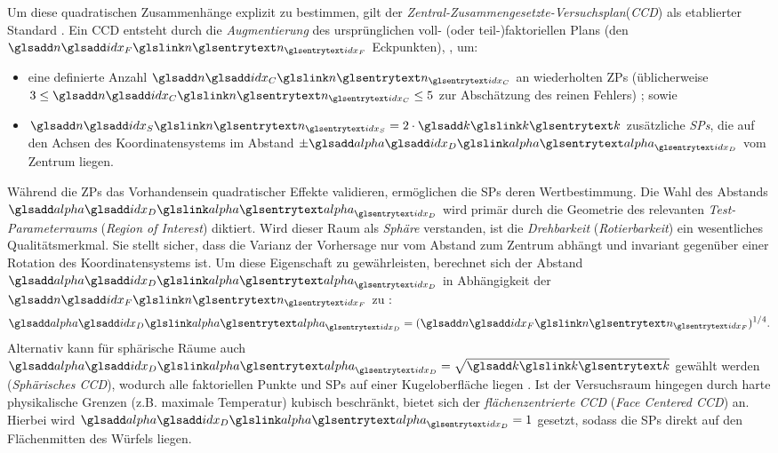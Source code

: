 Um diese quadratischen Zusammenhänge explizit zu bestimmen, gilt der \textit{Zentral-Zusammengesetzte-Versuchsplan}(\textit{\ac{CCD}}) als etablierter Standard .
Ein \ac{CCD} entsteht durch die \textit{Augmentierung} des ursprünglichen voll- (oder teil-)faktoriellen Plans (den $\symsub{n}{idx_F}$ Eckpunkten), , um:
\begin{itemize}
    \item eine definierte Anzahl $\symsub{n}{idx_C}$ an wiederholten \acp{ZP} (üblicherweise $3 \leq \symsub{n}{idx_C} \leq 5$ zur Abschätzung des reinen Fehlers) \cite{Montgomery.2021}; sowie
    \item $\symsub{n}{idx_S} = 2 \cdot \sym{k}$ zusätzliche \textit{\acp{SP}}, die auf den Achsen des Koordinatensystems im Abstand $\pm \symsub{alpha}{idx_D}$ vom Zentrum liegen.
\end{itemize}
Während die \acp{ZP} das Vorhandensein quadratischer Effekte validieren, ermöglichen die \acp{SP} deren Wertbestimmung.
Die Wahl des Abstands $\symsub{alpha}{idx_D}$ wird primär durch die Geometrie des relevanten \textit{Test-Parameterraums} (\textit{Region of Interest}) diktiert.
Wird dieser Raum als \textit{Sphäre} verstanden, ist die \textit{Drehbarkeit} (\textit{Rotierbarkeit}) ein wesentliches Qualitätsmerkmal.
Sie stellt sicher, dass die Varianz der Vorhersage nur vom Abstand zum Zentrum abhängt und invariant gegenüber einer Rotation des Koordinatensystems ist.
Um diese Eigenschaft zu gewährleisten, berechnet sich der Abstand $\symsub{alpha}{idx_D}$ in Abhängigkeit der  $\symsub{n}{idx_F}$ zu \cite{Box.1957,Montgomery.2020}:
\begin{equation} \label{eq:ccd_alpha}
    \symsub{alpha}{idx_D} = (\symsub{n}{idx_F})^{1/4}.
\end{equation}
Alternativ kann für sphärische Räume auch $\symsub{alpha}{idx_D} = \sqrt{\sym{k}}$ gewählt werden (\textit{Sphärisches \ac{CCD}}), wodurch alle faktoriellen Punkte und \acp{SP} auf einer Kugeloberfläche liegen \cite{Myers.2016}.
Ist der Versuchsraum hingegen durch harte physikalische Grenzen (z.B. maximale Temperatur) kubisch beschränkt, bietet sich der \textit{flächenzentrierte \ac{CCD}} (\textit{Face Centered \ac{CCD}}) an.
Hierbei wird $\symsub{alpha}{idx_D} = 1$ gesetzt, sodass die \acp{SP} direkt auf den Flächenmitten des Würfels liegen.
